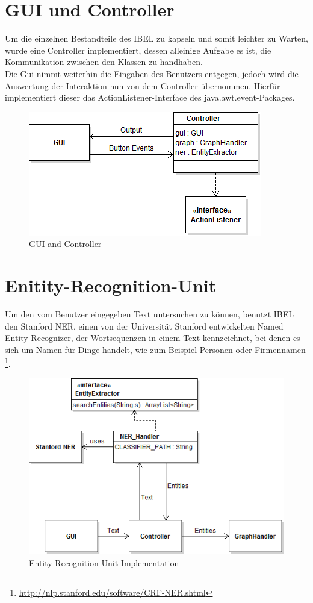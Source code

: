\documentclass[11pt, a4paper, oneside]{Thesis} %
\begin{document}
\section{GUI und Controller}
Um die einzelnen Bestandteile des IBEL zu kapseln und somit leichter zu Warten, wurde eine Controller implementiert, dessen alleinige Aufgabe es ist, die Kommunikation zwischen den Klassen zu handhaben. \\
Die Gui nimmt weiterhin die Eingaben des Benutzers entgegen, jedoch wird die Auswertung der Interaktion nun von dem Controller \"ubernommen. Hierf\"ur implementiert dieser das ActionListener-Interface des java.awt.event-Packages.
\begin{figure}[ht!]
\centering
\includegraphics[scale=0.55]{./guiCont.png}
\caption[GUI and Controller]{GUI and Controller}
\end{figure}

\section{Enitity-Recognition-Unit}
\label{Kapitel 3.2}
Um den vom Benutzer eingegeben Text untersuchen zu k\"onnen, benutzt IBEL den Stanford NER, einen von der Universit\"at Stanford entwickelten Named Entity Recognizer, der Wortsequenzen in einem Text kennzeichnet, bei denen es sich um Namen f\"ur Dinge handelt, wie zum Beispiel Personen oder Firmennamen \footnote{\url{http://nlp.stanford.edu/software/CRF-NER.shtml}}. 
\begin{figure}[ht!]
\centering
\includegraphics[scale=0.55]{./eruImp.png}
\caption[Entity-Recognition-Unit Impl.]{Entity-Recognition-Unit Implementation}
\end{figure}
\end{document}
